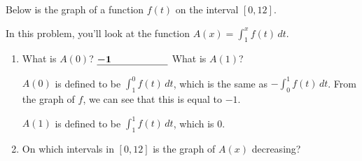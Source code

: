 \documentclass{article}
\begin{document}
\begin{enumerate}


  {
    Below is the graph of a function $f(t)$ on the interval $[0, 12]$.

    \begin{center}
    \end{center}

    In this problem, you'll look at the function $A(x) =\displaystyle
    \int_1^x f(t) \,dt$.
    \begin{enumerate}

    \item What is $A(0)$? $\fitb{1in}{-1}$ \qquad \qquad What is
      $A(1)$? 

      \begin{solution}
        $A(0)$ is defined to be $\displaystyle \int_1^0 f(t)\,dt$, which
        is the same as $-\displaystyle \int_0^1 f(t)\,dt$.  From the graph of
        $f$, we can see that this is equal to $-1$.

        $A(1)$ is defined to be $\displaystyle \int_1^1 f(t)\,dt$, which
        is 0. 
      \end{solution}

      \pspace{\vfill}

    \item \label{spring2011-final-8-decreasing}
      \begin{problem}[\vfill]
        On which intervals in $[0, 12]$ is the graph of $A(x)$
        decreasing?
      \end{problem}


\end{enumerate}}
\end{enumerate}
\end{document}
